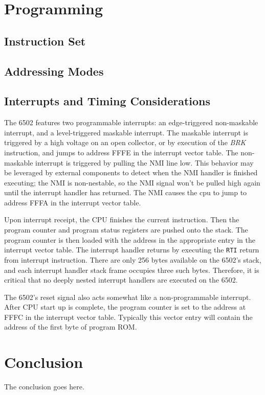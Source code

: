 \documentclass[journal]{IEEEtran}
\begin{document}
\section{Programming}

\subsection{Instruction Set}

\subsection{Addressing Modes}

\subsection{Interrupts and Timing Considerations}

The 6502 features two programmable interrupts: an edge-triggered non-maskable
interrupt, and a level-triggered maskable interrupt. The maskable interrupt
is triggered by a high voltage on an open collector, or by execution of the
\emph{BRK} instruction, and jumps to address FFFE in the interrupt vector table.
The non-maskable interrupt is triggered by pulling the NMI line low. This
behavior may be leveraged by external components to detect when the NMI handler
is finished executing; the NMI is non-nestable, so the NMI signal won't be
pulled high again until the interrupt handler has returned. The NMI causes the
cpu to jump to address FFFA in the interrupt vector table.

Upon interrupt receipt, the CPU finishes the current instruction. Then the
program counter and program status registers are pushed onto the stack. The
program counter is then loaded with the address in the appropriate entry in the
interrupt vector table. The interrupt handler returns by executing the
\texttt{RTI} return from interrupt instruction. There are only 256 bytes
available on the 6502's stack, and each interrupt handler stack frame occupies
three such bytes. Therefore, it is critical that no deeply nested interrupt
handlers are executed on the 6502.

The 6502's reset signal also acts somewhat like a non-programmable interrupt.
After CPU start up is complete, the program counter is set to the address at
FFFC in the interrupt vector table. Typically this vector entry will contain
the address of the first byte of program ROM.

\section{Conclusion}
The conclusion goes here.
\end{document}
